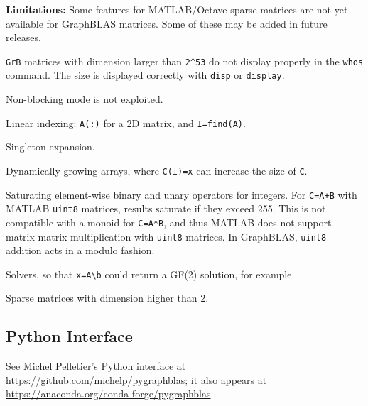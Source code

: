 \documentclass[12pt]{article}
\newenvironment{packed_itemize}{
\begin{itemize}
  \setlength{\itemsep}{1pt}
  \setlength{\parskip}{0pt}
  \setlength{\parsep}{0pt}
}{\end{itemize}}
\begin{document}
{\bf Limitations:}
Some features for MATLAB/Octave sparse matrices are not yet available for
GraphBLAS matrices.  Some of these may be added in future releases.

\begin{packed_itemize}
    \item \verb'GrB' matrices with dimension larger than \verb'2^53' do not
        display properly in the \verb'whos' command.  The size is displayed
        correctly with \verb'disp' or \verb'display'.
    \item Non-blocking mode is not exploited.
    \item Linear indexing: \verb'A(:)' for a 2D matrix, and \verb'I=find(A)'.
    \item Singleton expansion.
    \item Dynamically growing arrays, where \verb'C(i)=x' can increase
        the size of \verb'C'.
    \item Saturating element-wise binary and unary operators for integers.
        For \verb'C=A+B' with MATLAB \verb'uint8' matrices, results
        saturate if they exceed 255.  This is not compatible with
        a monoid for \verb'C=A*B', and thus MATLAB does not support
        matrix-matrix multiplication with \verb'uint8' matrices.
        In GraphBLAS, \verb'uint8' addition acts in a modulo fashion.
    \item Solvers, so that \verb'x=A\b' could return a GF(2) solution,
        for example.
    \item Sparse matrices with dimension higher than 2.
\end{packed_itemize}

\subsection{Python Interface}
\label{python}

See Michel Pelletier's Python interface at
\url{https://github.com/michelp/pygraphblas};
it also appears at
\url{https://anaconda.org/conda-forge/pygraphblas}.
\end{document}
